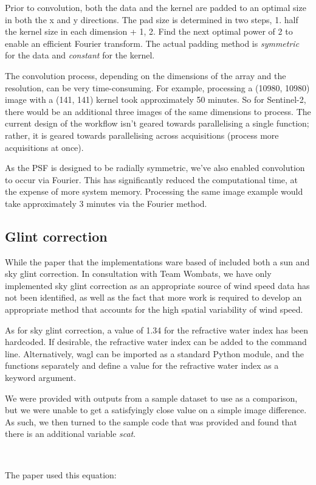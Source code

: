 \documentclass[a4paper]{article}
\begin{document}
\begin{flushleft}
    \clearpage

      Prior to convolution, both the data and the kernel are padded to an optimal size in both the x and y directions. The pad size is determined in two steps, 1. half the kernel size in each dimension + 1, 2. Find the next optimal power of 2 to enable an efficient Fourier transform. The actual padding method is \textit{symmetric} for the data and \textit{constant} for the kernel. \par
      The convolution process, depending on the dimensions of the array and the resolution, can be very time-consuming. For example, processing a (10980, 10980) image with a (141, 141) kernel took approximately 50 minutes. So for Sentinel-2, there would be an additional three images of the same dimensions to process. The current design of the workflow isn't geared towards parallelising a single function; rather, it is geared towards parallelising across acquisitions (process more acquisitions at once). \par
      As the PSF is designed to be radially symmetric, we've also enabled convolution to occur via Fourier. This has significantly reduced the computational time, at the expense of more system memory. Processing the same image example would take approximately 3 minutes via the Fourier method.
    \end{flushleft}

  \subsection{Glint correction}

    \begin{flushleft}
      While the paper that the implementations ware based of included both a sun and sky glint correction. In consultation with Team Wombats, we have only implemented sky glint correction as an appropriate source of wind speed data has not been identified, as well as the fact that more work is required to develop an appropriate method that accounts for the high spatial variability of wind speed. \par
      As for sky glint correction, a value of 1.34 for the refractive water index has been hardcoded. If desirable, the refractive water index can be added to the command line. Alternatively, wagl can be imported as a standard Python module, and the functions separately and define a value for the refractive water index as a keyword argument. \par
      We were provided with outputs from a sample dataset to use as a comparison, but we were unable to get a satisfyingly close value on a simple image difference. As such, we then turned to the sample code that was provided and found that there is an additional variable \textit{scat}. \par
\(\phantom{0}\)
      \par
      The paper used this equation: 
    \end{flushleft}
\end{document}
